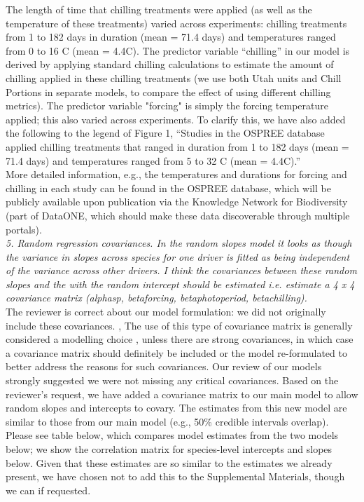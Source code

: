 \documentclass{article}
\begin{document}
The length of time that chilling treatments were applied (as well as the temperature of these treatments) varied across experiments: chilling treatments from 1 to 182 days in duration (mean = 71.4 days) and temperatures ranged from  0 to 16 \degree C (mean = 4.4\degree C). The predictor variable ``chilling'' in our model is derived by applying standard chilling calculations to estimate the amount of chilling applied in these chilling treatments (we use both Utah units and Chill Portions in separate models, to compare the effect of using different chilling metrics). The predictor variable "forcing" is simply the forcing temperature applied; this also varied across experiments. 
To clarify this, we have also added the following to the legend of Figure 1, ``Studies in the OSPREE database applied chilling treatments that ranged in duration from 1 to 182 days (mean = 71.4 days) and temperatures ranged from  5 to 32 \degree C (mean = 4.4\degree C).''\\ %

More detailed information, e.g., the temperatures and durations for forcing and chilling in each study can be found in the OSPREE database, which will be publicly available upon publication via the Knowledge Network for Biodiversity (part of DataONE, which should make these data discoverable through multiple portals). \\

\emph{5. Random regression covariances. In the random slopes model it looks as though the variance in
slopes across species for one driver is fitted as being independent of the variance across other
drivers. I think the covariances between these random slopes and the with the random
intercept should be estimated i.e. estimate a 4 x 4 covariance matrix (alphasp, betaforcing,
betaphotoperiod, betachilling).}\\

The reviewer is correct about our model formulation: we did not originally include these covariances. , The use of this type of covariance matrix is generally considered a modelling choice \citep{gelman2006}, unless there are strong covariances, in which case a covariance matrix should definitely be included or the model re-formulated to better address the reasons for such covariances.  Our review of our models strongly suggested we were not missing any critical covariances. Based on the reviewer's request, we have added a covariance matrix to our main model to allow random slopes and intercepts to covary. The estimates from this new model are similar to those from our main model (e.g., 50\% credible intervals overlap). Please see table below, which compares model estimates from the two models below; we show the correlation matrix for species-level intercepts and slopes below. Given that these estimates are so similar to the estimates we already present, we have chosen not to add this to the Supplemental Materials, though we can if requested.\\
\end{document}
